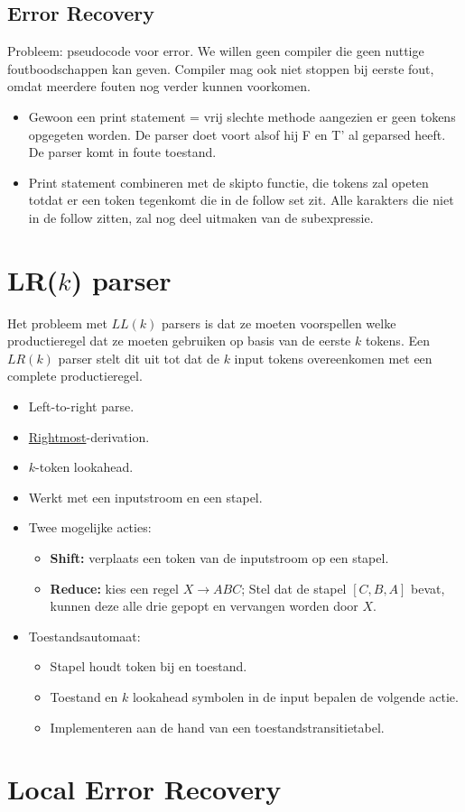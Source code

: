 \subsection{Error Recovery}
Probleem: pseudocode voor error. We willen geen compiler die geen nuttige foutboodschappen kan geven. Compiler mag ook niet stoppen bij eerste fout, omdat meerdere fouten nog verder kunnen voorkomen.
\begin{itemize}
	\item Gewoon een print statement = vrij slechte methode aangezien er geen tokens opgegeten worden. De parser doet voort alsof hij F en T' al geparsed heeft. De parser komt in foute toestand.
	\item Print statement combineren met de skipto functie, die tokens zal opeten totdat er een token tegenkomt die in de follow set zit. Alle karakters die niet in de follow zitten, zal nog deel uitmaken van de subexpressie. 
\end{itemize}

\section{LR($k$) parser}
Het probleem met $LL(k)$ parsers is dat ze moeten voorspellen welke productieregel dat ze moeten gebruiken op basis van de eerste $k$ tokens. Een $LR(k)$ parser stelt dit uit tot dat de $k$ input tokens overeenkomen met een complete productieregel.
\begin{itemize}
	\item Left-to-right parse.
	\item \underline{Rightmost}-derivation.
	\item $k$-token lookahead.
	\item Werkt met een inputstroom en een stapel.
	\item Twee mogelijke acties:
	\begin{itemize}
		\item \textbf{Shift:} verplaats een token van de inputstroom op een stapel.
		\item \textbf{Reduce:} kies een regel $X \rightarrow A B C$; Stel dat de stapel $[C, B, A]$ bevat, kunnen deze alle drie gepopt en vervangen worden door $X$.
	\end{itemize}
	\item Toestandsautomaat:
	\begin{itemize}
		\item Stapel houdt token bij en toestand.
		\item Toestand en $k$ lookahead symbolen in de input bepalen de volgende actie.
		\item Implementeren aan de hand van een toestandstransitietabel.
	\end{itemize}
\end{itemize}

\section{Local Error Recovery}